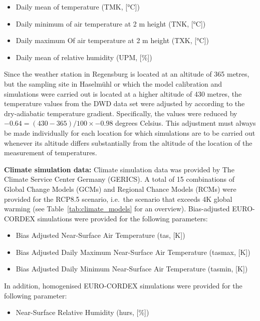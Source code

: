 \documentclass[a4paper, 11pt]{scrartcl}
\begin{document}
\begin{itemize}[noitemsep]
	\item Daily mean of temperature (TMK, [°C])
	\item Daily minimum of air temperature at 2 m height (TNK, [°C])
	\item Daily maximum Of air temperature at 2 m height (TXK, [°C])
	\item Daily mean of relative humidity (UPM, [\%])
\end{itemize}

Since the weather station in Regensburg is located at an altitude of 365 metres, but the sampling site in Haselmühl or which the model calibration and simulations were carried out is located at a higher altitude of 430 metres, the temperature values from the DWD data set were adjusted by according to the dry-adiabatic temperature gradient. Specifically, the values were reduced by $-0.64 = (430 - 365) / 100 \times -0.98$ degrees Celsius. This adjustment must always be made individually for each location for which simulations are to be carried out whenever its altitude differs substantially from the altitude of the location of the measurement of temperatures.

\textbf{Climate simulation data:} Climate simulation data was provided by The Climate Service Center Germany (GERICS). A total of 15 combinations of Global Change Models (GCMs) and Regional Chance Models (RCMs) were provided for the RCP8.5 scenario, i.e.\ the scenario that exceeds 4K global warming (see Table~\ref{tab:climate_models} for an overview). Bias-adjusted EURO-CORDEX simulations were provided for the following parameters:
\begin{itemize}[noitemsep]
\item Bias Adjusted Near-Surface Air Temperature (tas, [K])
\item Bias Adjusted Daily Maximum Near-Surface Air Temperature (tasmax, [K])
\item Bias Adjusted Daily Minimum Near-Surface Air Temperature (tasmin, [K])
\end{itemize}

In addition, homogenised EURO-CORDEX simulations were provided for the following parameter:
\begin{itemize}
\item Near-Surface Relative Humidity (hurs, [\%])
\end{itemize}
\end{document}
